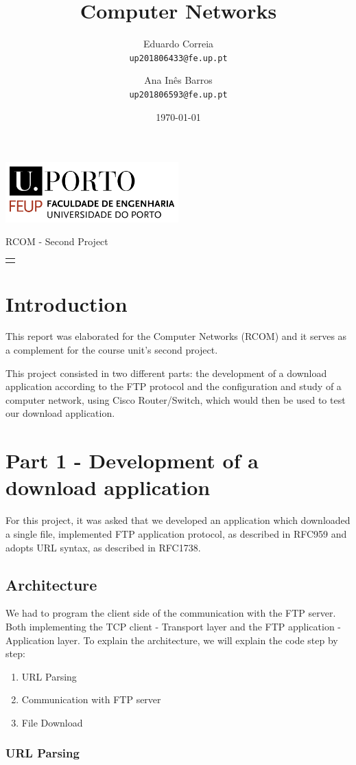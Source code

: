 \documentclass[11pt]{report}
\title{\textbf{Computer Networks}}
\author{
    \Large
    Eduardo Correia \\
    \texttt{up201806433@fe.up.pt}
    \and
    \Large
    Ana Inês Barros \\
    \texttt{up201806593@fe.up.pt}
}
\date{\today}
\makeatletter
\renewcommand{\maketitle}{
    \begin{titlepage}
        \includegraphics[width=0.5\textwidth]{images/feup.png}
        \begin{center} 
            \par\vspace{8cm}
            {\Huge\@title}
            \par\vspace{1cm}
            {\huge RCOM - Second Project}
            \par\vspace{1cm}
            \begin{tabular}[t]{c}
             \@author
            \end{tabular}
            \vfill
            \@date
        \end{center}
    \end{titlepage}
}
\makeatother
\begin{document}
\maketitle

\titlespacing*{\chapter}{0pt}{0pt}{1pt}

\tableofcontents

\chapter{Introduction}

This report was elaborated for the Computer Networks (RCOM) and it serves as a complement for the course unit's second project.

This project consisted in two different parts: the development of a download application according to the FTP protocol and the configuration and study of a computer network, using Cisco Router/Switch, which would then be used to test our download application.

\chapter{Part 1 - Development of a download application}

For this project, it was asked that we developed an application which downloaded a single file, implemented FTP application protocol, as described in RFC959 and adopts URL syntax, as described in RFC1738.

\section{Architecture}
We had to program the client side of the communication with the FTP server. Both implementing the TCP client - Transport layer and the FTP application - Application layer. To explain the architecture, we will explain the code step by step:
\begin{enumerate}
    \item URL Parsing 
    \item Communication with FTP server
    \item File Download
\end{enumerate}

\subsection{URL Parsing}
\end{document}
